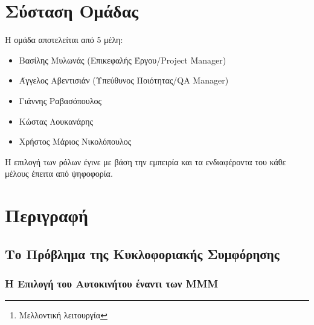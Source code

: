 \documentclass[11pt]{article}
\begin{document}

\newpage

\begin{abstract}
    Ανάπτυξη συστήματος και συνοδεύουσας εφαρμογής για την εύρεση/ενοικίαση
    θέσεων στάθμευσης και την διευκόλυνση συνεπιβίβασης σε κοινές διαδρομές
    (carpooling).
    Η εφαρμογή εγκαθισταται σε κινητές συσκευές και παρέχει ζωντανή πληροφόρηση
    αντλώντας πληροφορίες από τους χρήστες, στατιστικά μοντέλα και από δίκτυα
    αισθητήρων\footnote{Μελλοντική λειτουργία} όπου αυτό είναι δυνατό. Η
    εφαρμογή απευθύνεται αμφότερα σε οδηγούς αυτοκινήτων αλλά και σε πεζούς.
    Στόχος είναι η καλύτερη αξιοποίηση του οδικού δικτύου και η μείωση της
    κυκλοφοριακής συμφόρησης σε αστικές περιοχές.
\end{abstract}

\newpage

\tableofcontents

\newpage

\section{Σύσταση Ομάδας}

Η ομάδα αποτελείται από 5 μέλη:

\begin{itemize}
    \item Βασίλης Μυλωνάς (Επικεφαλής Έργου/Project Manager)
    \item Άγγελος Αβεντισιάν (Υπεύθυνος Ποιότητας/QA Manager)
    \item Γιάννης Ραβασόπουλος
    \item Κώστας Λουκανάρης
    \item Χρήστος Μάριος Νικολόπουλος
\end{itemize}

Η επιλογή των ρόλων έγινε με βάση την εμπειρία και τα ενδιαφέροντα του κάθε
μέλους έπειτα από ψηφοφορία.

\newpage

\section{Περιγραφή}

\subsection{Το Πρόβλημα της Κυκλοφοριακής Συμφόρησης}

\subsubsection{Η Επιλογή του Αυτοκινήτου έναντι των ΜΜΜ}
\end{document}
